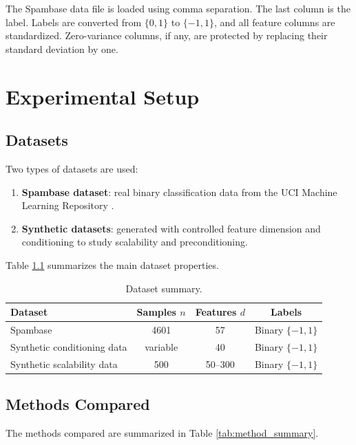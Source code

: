 \documentclass[12pt,a4paper]{report}
\begin{document}
The Spambase data file is loaded using comma separation. The last column is the label. Labels are converted from \(\{0,1\}\) to \(\{-1,1\}\), and all feature columns are standardized. Zero-variance columns, if any, are protected by replacing their standard deviation by one.

\chapter{Experimental Setup}

\section{Datasets}

Two types of datasets are used:

\begin{enumerate}
    \item \textbf{Spambase dataset}: real binary classification data from the UCI Machine Learning Repository \cite{spambase}.
    \item \textbf{Synthetic datasets}: generated with controlled feature dimension and conditioning to study scalability and preconditioning.
\end{enumerate}

Table \ref{tab:data_summary} summarizes the main dataset properties.

\begin{table}[H]
\centering
\caption{Dataset summary.}
\label{tab:data_summary}
\begin{tabular}{lccc}
\toprule
Dataset & Samples \(n\) & Features \(d\) & Labels \\
\midrule
Spambase & 4601 & 57 & Binary \(\{-1,1\}\) \\
Synthetic conditioning data & variable & 40 & Binary \(\{-1,1\}\) \\
Synthetic scalability data & 500 & 50--300 & Binary \(\{-1,1\}\) \\
\bottomrule
\end{tabular}
\end{table}

\section{Methods Compared}

The methods compared are summarized in Table \ref{tab:method_summary}.
\end{document}
